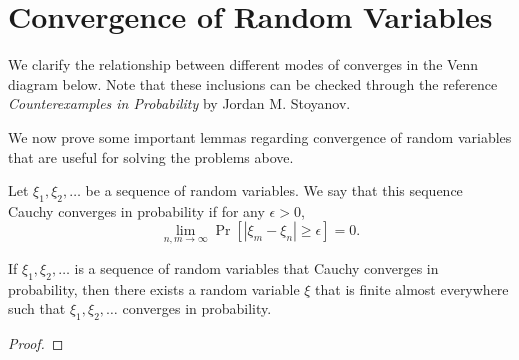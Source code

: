 \section{Convergence of Random Variables}
We clarify the relationship between different modes of converges in the Venn diagram below. Note that these inclusions can be checked through the reference \textit{Counterexamples in Probability} by Jordan M. Stoyanov. 
\begin{center}
\end{center}
We now prove some important lemmas regarding convergence of random variables that are useful for solving the problems above.
\begin{definition}
    Let $\xi_1,\xi_2,\ldots$ be a sequence of random variables. We say that this sequence Cauchy converges in probability if for any $\epsilon > 0$, 
    \[
    \lim_{n,m\to\infty} \Pr\left[ |\xi_m - \xi_n| \geq \epsilon\right] = 0.
    \]
\end{definition}

\begin{lemma}
    If $\xi_1,\xi_2,\ldots$ is a sequence of random variables that Cauchy converges in probability, then there exists a random variable $\xi$ that is finite almost everywhere such that $\xi_1,\xi_2,\ldots$ converges in probability. 
\end{lemma}
\begin{proof}
    
\end{proof}